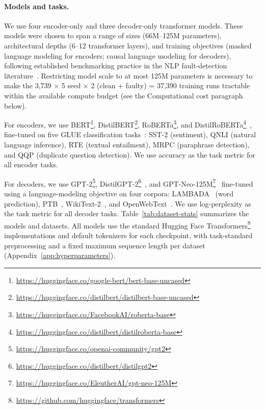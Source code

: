 \paragraph{Models and tasks.}
We use four encoder-only and three decoder-only transformer models. These models were chosen to span a range of sizes (66M--125M parameters), architectural depths (6--12 transformer layers), and training objectives (masked language modeling for encoders; causal language modeling for decoders), following established benchmarking practice in the NLP fault-detection literature~\citep{devlin2019bert,liu2019roberta,sanh2019distilbert,radford2019language,black2021gptneo}. Restricting model scale to at most 125M parameters is necessary to make the 3{,}739 $\times$ 5 seed $\times$ 2 (clean + faulty) = 37{,}390 training runs tractable within the available compute budget (see the Computational cost paragraph below).

For encoders, we use BERT\footnote{\url{https://huggingface.co/google-bert/bert-base-uncased}}, DistilBERT\footnote{\url{https://huggingface.co/distilbert/distilbert-base-uncased}}, RoBERTa\footnote{\url{https://huggingface.co/FacebookAI/roberta-base}}, and DistilRoBERTa\footnote{\url{https://huggingface.co/distilbert/distilroberta-base}}~\citep{devlin2019bert,liu2019roberta,sanh2019distilbert}, fine-tuned on five GLUE classification tasks~\citep{wang2018glue}: SST-2 (sentiment), QNLI (natural language inference), RTE (textual entailment), MRPC (paraphrase detection), and QQP (duplicate question detection). We use accuracy as the task metric for all encoder tasks.

For decoders, we use GPT-2\footnote{\url{https://huggingface.co/openai-community/gpt2}}, DistilGPT-2\footnote{\url{https://huggingface.co/distilbert/distilgpt2}}~\citep{radford2019language}, and GPT-Neo-125M\footnote{\url{https://huggingface.co/EleutherAI/gpt-neo-125M}}~\citep{black2021gptneo} fine-tuned using a language-modeling objective on four corpora: LAMBADA~\citep{paperno2016lambada} (word prediction), PTB~\citep{marcus1993ptb}, WikiText-2~\citep{merity2017wikitext}, and OpenWebText~\citep{gokaslan2019openwebtext}. We use log-perplexity as the task metric for all decoder tasks. Table~\ref{tab:dataset-stats} summarizes the models and datasets. All models use the standard Hugging Face Transformers\footnote{\url{https://github.com/huggingface/transformers}} implementations and default tokenizers for each checkpoint, with task-standard preprocessing and a fixed maximum sequence length per dataset (Appendix~\ref{app:hyperparameters}).

